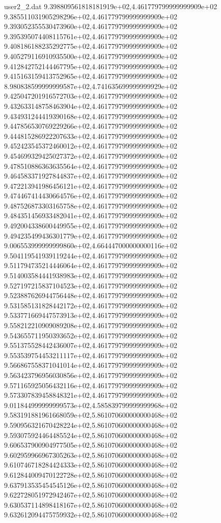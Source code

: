 \begin{filecontents}{user2_2.dat}
9.398809561818181919e+02,4.461779799999999909e+02
9.385511031905298296e+02,4.461779799999999909e+02
9.393052355530473960e+02,4.461779799999999909e+02
9.395395074408115761e+02,4.461779799999999909e+02
9.408186188235292775e+02,4.461779799999999909e+02
9.405279116910935500e+02,4.461779799999999909e+02
9.412842752144467795e+02,4.461779799999999909e+02
9.415163159413752965e+02,4.461779799999999909e+02
8.980838599999999587e+02,4.741635699999999929e+02
9.425047201916572703e+02,4.461779799999999909e+02
9.432633148758463904e+02,4.461779799999999909e+02
9.434931244419390168e+02,4.461779799999999909e+02
9.447856530769229266e+02,4.461779799999999909e+02
9.444815286922207633e+02,4.461779799999999909e+02
9.452423545372460012e+02,4.461779799999999909e+02
9.454699329425027372e+02,4.461779799999999909e+02
9.478510886363635564e+02,4.461779799999999909e+02
9.464583371927844837e+02,4.461779799999999909e+02
9.472213941986456121e+02,4.461779799999999909e+02
9.474467414430664576e+02,4.461779799999999909e+02
9.487526873303165758e+02,4.461779799999999909e+02
9.484351456933482041e+02,4.461779799999999909e+02
9.492004338600449955e+02,4.461779799999999909e+02
9.494235499436301779e+02,4.461779799999999909e+02
9.006553999999999860e+02,4.664447000000000116e+02
9.504119541939119244e+02,4.461779799999999909e+02
9.511794735214446064e+02,4.461779799999999909e+02
9.514003584441938983e+02,4.461779799999999909e+02
9.527197215837104523e+02,4.461779799999999909e+02
9.523887626944756448e+02,4.461779799999999909e+02
9.531585131828442172e+02,4.461779799999999909e+02
9.533771669447573913e+02,4.461779799999999909e+02
9.558212210909089208e+02,4.461779799999999909e+02
9.543655711950393652e+02,4.461779799999999909e+02
9.551375528442436007e+02,4.461779799999999909e+02
9.553539754453211117e+02,4.461779799999999909e+02
9.566867558371041014e+02,4.461779799999999909e+02
9.563423796956030856e+02,4.461779799999999909e+02
9.571165925056432116e+02,4.461779799999999909e+02
9.573307839458848321e+02,4.461779799999999909e+02
9.011844999999999573e+02,4.585839799999999968e+02
9.583191881961668059e+02,5.861070600000000468e+02
9.590956321670428224e+02,5.861070600000000468e+02
9.593075924464485524e+02,5.861070600000000468e+02
9.606537900904977505e+02,5.861070600000000468e+02
9.602959966967305263e+02,5.861070600000000468e+02
9.610746718284424333e+02,5.861070600000000468e+02
9.612844009470122728e+02,5.861070600000000468e+02
9.637913535454545126e+02,5.861070600000000468e+02
9.622728051972942467e+02,5.861070600000000468e+02
9.630537114898418167e+02,5.861070600000000468e+02
9.632612094475759932e+02,5.861070600000000468e+02

\end{filecontents}
